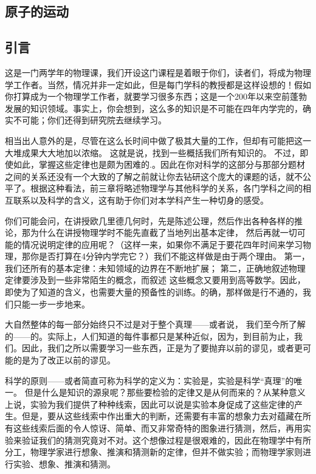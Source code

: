 \documentclass[11pt,oneside]{book}
\begin{document}
\begin{common-format}
\mainmatter

\chapter{原子的运动}

\section{引言}
这是一门两学年的物理课，我们开设这门课程是着眼于你们，读者们，将成为物理学工作者。当然，情况并非一定如此，但是每门学科的教授都是这样设想的！假如你打算成为一个物理学工作者，就要学习很多东西；这是一个200年以来空前蓬勃发展的知识领域。事实上，你会想到，这么多的知识是不可能在四年内学完的，确实不可能；你们还得到研究院去继续学习。

相当出人意外的是，尽管在这么长时间中做了极其大量的工作，但却有可能把这一大堆成果大大地加以浓缩。 这就是说，找到一些概括我们所有知识的。 不过，即使如此，掌握这些定律也是颇为困难的.。因此在你对科学的这部分与那部分题材之间的关系还没有一个大致的了解之前就让你去钻研这个庞大的课题的话，就不公平了。根据这种看法，前三章将略述物理学与其他科学的关系，各门学科之间的相互联系以及科学的含义，这有助于你们对本学科产生一种切身的感受。

你们可能会问，在讲授欧几里德几何时，先是陈述公理，然后作出各种各样的推论，那为什么在讲授物理学时不能先直截了当地列出基本定律， 然后再就一切可能的情况说明定律的应用呢？（这样一来，如果你不满足于要花四年时间来学习物理，那你是否打算在4分钟内学完它？）我们不能这样做是由于两个理由。 第一，我们还所有的基本定律：未知领域的边界在不断地扩展； 第二，正确地叙述物理定律要涉及到一些非常陌生的概念，而叙述
这些概念又要用到高等数学。因此，即使为了知道的含义，也需要大量的预备性的训练。的确，那样做是行不通的，我们只能一步一步地来。

大自然整体的每一部分始终只不过是对于整个真理——或者说， 我们至今所了解的——的。实际上，人们知道的每件事都只是某种近似，因为，到目前为止，我们。因此，我们之所以需要学习一些东西，正是为了要抛弃以前的谬见，或者更可能的是为了改正以前的谬见。

科学的原则——或者简直可称为科学的定义为：实验是，实验是科学“真理”的唯一。 但是什么是知识的源泉呢？那些要检验的定律又是从何而来的？从某种意义上说，实验为我们提供了种种线索，因此可以说是实验本身促成了这些定律的产生。但是，要从这些线索中作出重大的判断，还需要有丰富的想象力去对蕴藏在所有这些线索后面的令人惊讶、简单、而又非常奇特的图象进行猜测，然后，再用实验来验证我们的猜测究竟对不对。这个想像过程是很艰难的，因此在物理学中有所分工，物理学家进行想象、推演和猜测新的定律，但并不做实验；而物理学家则进行实验、想象、推演和猜测。


\end{common-format}
\end{document}
